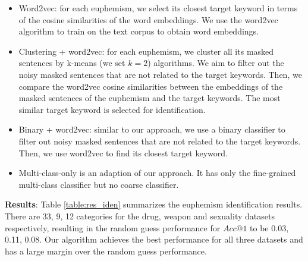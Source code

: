 \begin{itemize}%
	\item Word2vec: for each euphemism, we select its closest target keyword in terms of the cosine similarities of the word embeddings. We use the word2vec algorithm \cite{mikolov2013distributed,mikolov2013efficient} to train on the text corpus to obtain word embeddings. 
	\item Clustering + word2vec: for each euphemism, we cluster all its masked sentences by k-means (we set $k=2$) algorithms. We aim to filter out the noisy masked sentences that are not related to the target keywords. Then, we compare the word2vec cosine similarities between the embeddings of the masked sentences of the euphemism and the target keywords. The most similar target keyword is selected for identification. 
	\item Binary + word2vec: similar to our approach, we use a binary classifier to filter out noisy masked sentences that are not related to the target keywords. Then, we use word2vec to find its closest target keyword. 
	\item Multi-class-only is an adaption of our approach. It has only the fine-grained multi-class classifier but no coarse classifier. 
\end{itemize}


\noindent \textbf{Results}: 
Table \ref{table:res_iden} summarizes the euphemism identification results. 
There are 33, 9, 12 categories for the drug, weapon and sexuality datasets respectively, resulting in the random guess performance for $Acc@1$ to be 0.03, 0.11, 0.08. 
Our algorithm achieves the best performance for all three datasets and has a large margin over the random guess performance. 


